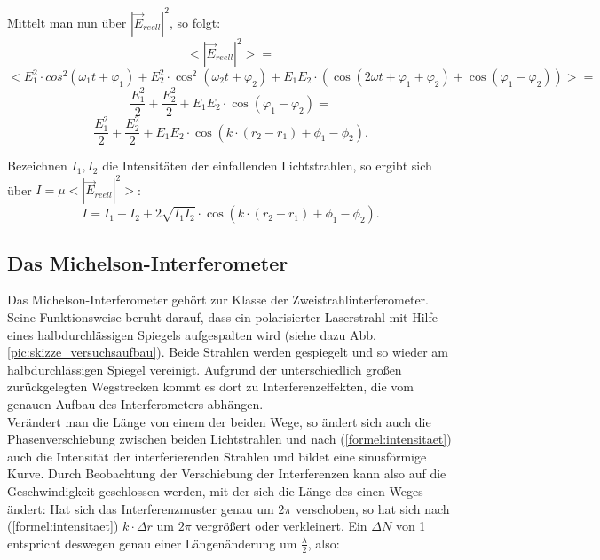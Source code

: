 Mittelt man nun über $ | \vec{E}_{reell} |^{2} $, so folgt: 
\begin{equation}
\nonumber
<| \vec{E}_{reell} |^{2}> = 
\end{equation}
\begin{equation}
\nonumber
< E_{1}^{2} \cdot cos^{2}(\omega_{1}t + \varphi_{1}) + E_{2}^{2} \cdot \cos^{2}(\omega_{2}t + \varphi_{2}) + E_{1}E_{2} \cdot (\cos(2\omega t + \varphi_{1} + \varphi_{2}) + \cos(\varphi_{1} - \varphi_{2})) > = 
\end{equation}
\begin{equation}
\nonumber
\frac{E_{1}^{2}}{2} + \frac{E_{2}^{2}}{2} + E_{1}E_{2} \cdot \cos(\varphi_{1} - \varphi_{2}) = 
\end{equation}
\begin{equation}
\frac{E_{1}^{2}}{2} + \frac{E_{2}^{2}}{2} + E_{1}E_{2} \cdot \cos( k \cdot (r_{2} - r_{1}) + \phi_{1} - \phi_{2}).
\end{equation}

Bezeichnen $ I_{1}, I_{2} $ die Intensitäten der einfallenden Lichtstrahlen, so ergibt sich über $ I = \mu <|\vec{E}_{reell}|^{2}> $: 
\begin{equation}
\label{formel:intensitaet}
I = I_{1} + I_{2} + 2 \sqrt{I_{1} I_{2}} \cdot \cos( k \cdot (r_{2} - r_{1}) + \phi_{1} - \phi_{2}).
\end{equation}





\subsection{Das Michelson-Interferometer}

Das Michelson-Interferometer gehört zur Klasse der Zweistrahlinterferometer. Seine Funktionsweise beruht darauf, dass ein polarisierter Laserstrahl mit Hilfe eines halbdurchlässigen Spiegels aufgespalten wird (siehe dazu Abb. \ref{pic:skizze_versuchsaufbau}). Beide Strahlen werden gespiegelt und so wieder am halbdurchlässigen Spiegel vereinigt. Aufgrund der unterschiedlich großen zurückgelegten Wegstrecken kommt es dort zu Interferenzeffekten, die vom genauen Aufbau des Interferometers abhängen.\\
Verändert man die Länge von einem der beiden Wege, so ändert sich auch die Phasenverschiebung zwischen beiden Lichtstrahlen und nach (\ref{formel:intensitaet}) auch die Intensität der interferierenden Strahlen und bildet eine sinusförmige Kurve. Durch Beobachtung der Verschiebung der Interferenzen kann also auf die Geschwindigkeit geschlossen werden, mit der sich die Länge des einen Weges ändert: 
Hat sich das Interferenzmuster genau um $ 2 \pi $ verschoben, so hat sich nach (\ref{formel:intensitaet}) $ k \cdot \Delta r $ um $ 2 \pi $ vergrößert oder verkleinert.
Ein $ \Delta N $ von 1 entspricht deswegen genau einer Längenänderung um $ \frac{\lambda}{2} $, also:


